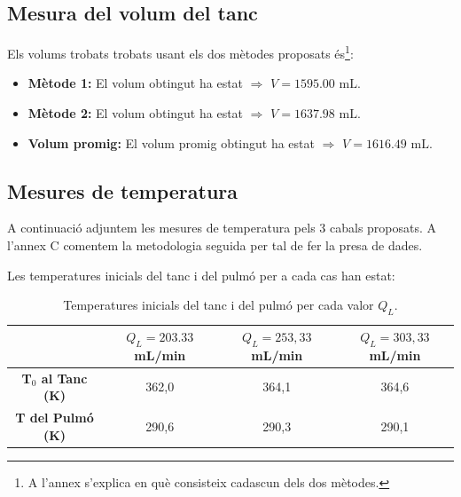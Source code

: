 \documentclass[10pt, twoside]{article}
\begin{document}
\subsection{Mesura del volum del tanc}
Els volums trobats trobats usant els dos mètodes proposats és\footnote{A l'annex s'explica en què consisteix cadascun dels dos mètodes.}:
\begin{itemize}
    \item \textbf{Mètode 1: }El volum obtingut ha estat $\Rightarrow$ $\boxed{V = 1595.00 \text{ mL}}$.
    \item \textbf{Mètode 2: }El volum obtingut ha estat $\Rightarrow$ $\boxed{V = 1637.98 \text{ mL}}$.
    \item \textbf{Volum promig: }El volum promig obtingut ha estat $\Rightarrow$ $\boxed{V = 1616.49 \text{ mL}}$.
\end{itemize}

\subsection{Mesures de temperatura}
A continuació adjuntem les mesures de temperatura pels 3 cabals proposats. A l'annex C comentem la metodologia seguida per tal de fer la presa de dades.

Les temperatures inicials del tanc i del pulmó per a cada cas han estat:

\begin{table}[h!]
    \centering
    \caption{Temperatures inicials del tanc i del pulmó per cada valor $Q_L$.}
    \begin{tabular}{cccc}
        \toprule
        & $Q_L = 203.33$ mL/min & $Q_L = 253,33$ mL/min & $Q_L = 303,33$ mL/min \\
        \midrule
        \textbf{T$_0$ al Tanc (K)} & 362,0 & 364,1 & 364,6 \\
        \textbf{T del Pulmó (K)}  & 290,6 & 290,3 & 290,1 \\
        \bottomrule
    \end{tabular}
    \label{tabla:temperaturas}
\end{table}
\end{document}
